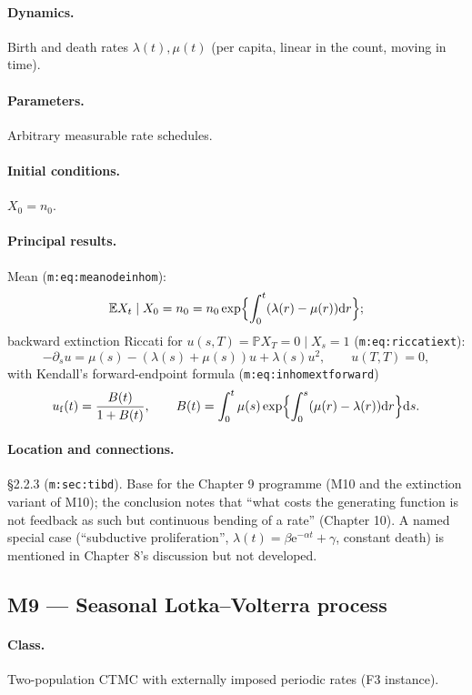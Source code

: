 \documentclass[11pt,a4paper]{article}
\newcommand{\PR}{\mathbb{P}}
\newcommand{\EX}{\mathbb{E}}
\newcommand{\ee}{\mathrm{e}}
\newcommand{\dd}{\mathrm{d}}
\begin{document}
\paragraph{Dynamics.} Birth and death rates $\lambda(t),\mu(t)$ (per
capita, linear in the count, moving in time).

\paragraph{Parameters.} Arbitrary measurable rate schedules.

\paragraph{Initial conditions.} $X_0=n_0$.

\paragraph{Principal results.} Mean (\texttt{m:eq:meanodeinhom}):
\[
\EX{X_t\mid X_0=n_0}=n_0\exp\Bigl\{\int_0^t(\lambda(r)-\mu(r))\dd r\Bigr\};
\]
backward extinction Riccati for $u(s,T)=\PR{X_T=0\mid X_s=1}$
(\texttt{m:eq:riccatiext}):
\[
-\partial_su=\mu(s)-(\lambda(s)+\mu(s))u+\lambda(s)u^2,\qquad u(T,T)=0,
\]
with Kendall's forward-endpoint formula (\texttt{m:eq:inhomextforward})
\[
u_{\rm f}(t)=\frac{B(t)}{1+B(t)},\qquad
B(t)=\int_0^t\mu(s)\exp\Bigl\{\int_0^s(\mu(r)-\lambda(r))\dd r\Bigr\}\dd s .
\]

\paragraph{Location and connections.} \S2.2.3 (\texttt{m:sec:tibd}). Base
for the Chapter 9 programme (M10 and the extinction variant of M10); the
conclusion notes that ``what costs the generating function is not feedback
as such but continuous bending of a rate'' (Chapter 10). A named special
case (``subductive proliferation'', $\lambda(t)=\beta\ee^{-\alpha t}+\gamma$,
constant death) is mentioned in Chapter 8's discussion but not developed.

\subsection{M9 --- Seasonal Lotka--Volterra process}

\paragraph{Class.} Two-population CTMC with externally imposed periodic
rates (F3 instance).
\end{document}
